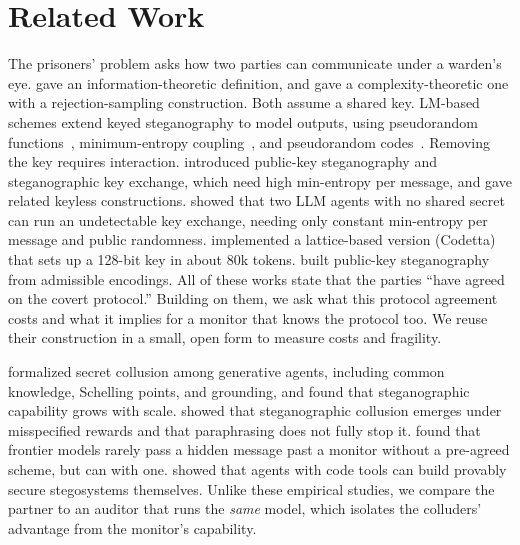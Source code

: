 \section{Related Work}
\label{sec:related}

The prisoners' problem asks how two parties can communicate under a warden's eye. \citet{cachin1998information} gave an information-theoretic definition, and \citet{hopper2002provably} gave a complexity-theoretic one with a rejection-sampling construction. Both assume a shared key. LM-based schemes extend keyed steganography to model outputs, using pseudorandom functions~\citep{christ2023undetectable,zamir2024excuse}, minimum-entropy coupling~\citep{dewitt2022perfectly}, and pseudorandom codes~\citep{christ2024pseudorandom}. Removing the key requires interaction. \citet{vonahn2004public} introduced public-key steganography and steganographic key exchange, which need high min-entropy per message, and \citet{horel2019subvert} gave related keyless constructions. \citet{vaikuntanathan2026undetectable} showed that two LLM agents with no shared secret can run an undetectable key exchange, needing only constant min-entropy per message and public randomness. \citet{pang2026codetta} implemented a lattice-based version (Codetta) that sets up a 128-bit key in about 80k tokens. \citet{zhang2025public} built public-key steganography from admissible encodings. All of these works state that the parties ``have agreed on the covert protocol.'' Building on them, we ask what this protocol agreement costs and what it implies for a monitor that knows the protocol too. We reuse their construction in a small, open form to measure costs and fragility.

\citet{motwani2024secret} formalized secret collusion among generative agents, including common knowledge, Schelling points, and grounding, and found that steganographic capability grows with scale. \citet{mathew2024hidden} showed that steganographic collusion emerges under misspecified rewards and that paraphrasing does not fully stop it. \citet{zolkowski2025early} found that frontier models rarely pass a hidden message past a monitor without a pre-agreed scheme, but can with one. \citet{rippin2026tool} showed that agents with code tools can build provably secure stegosystems themselves. Unlike these empirical studies, we compare the partner to an auditor that runs the \emph{same} model, which isolates the colluders' advantage from the monitor's capability.

